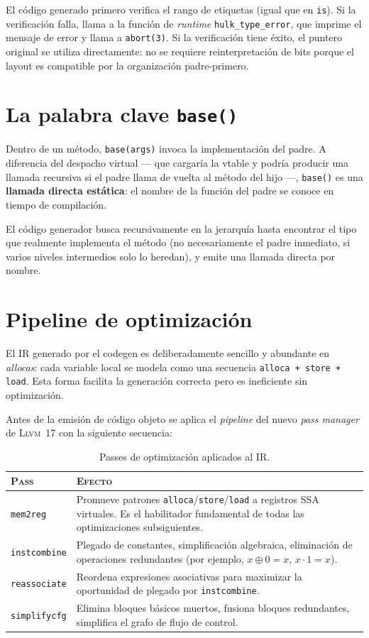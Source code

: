 \documentclass[11pt,a4paper,oneside,openany]{report}
\newcommand{\code}[1]{\texttt{#1}}
\newcommand{\llvm}{\textsc{Llvm}}
\begin{document}
El código generado primero verifica el rango de etiquetas (igual que en \code{is}).
Si la verificación falla, llama a la función de \textit{runtime}
\code{hulk\_type\_error}, que imprime el mensaje de error y llama a \code{abort(3)}.
Si la verificación tiene éxito, el puntero original se utiliza directamente: no se
requiere reinterpretación de bits porque el layout es compatible por la
organización padre-primero.

\section{La palabra clave \code{base()}}

Dentro de un método, \code{base(args)} invoca la implementación del padre. A
diferencia del despacho virtual --- que cargaría la vtable y podría producir una
llamada recursiva si el padre llama de vuelta al método del hijo ---, \code{base()}
es una \textbf{llamada directa estática}: el nombre de la función del padre se
conoce en tiempo de compilación.

El código generador busca recursivamente en la jerarquía hasta encontrar el tipo
que realmente implementa el método (no necesariamente el padre inmediato, si
varios niveles intermedios solo lo heredan), y emite una llamada directa por
nombre.

\section{Pipeline de optimización}

El IR generado por el codegen es deliberadamente sencillo y abundante en
\textit{allocas}: cada variable local se modela como una secuencia
\code{alloca + store + load}. Esta forma facilita la generación correcta pero es
ineficiente sin optimización.

Antes de la emisión de código objeto se aplica el \textit{pipeline} del nuevo
\textit{pass manager} de \llvm{}~17 con la siguiente secuencia:

\begin{table}[H]
\centering
\caption{Passes de optimización aplicados al IR.}
\label{tab:passes}
\begin{tabularx}{\textwidth}{lX}
\toprule
\textsc{Pass} & \textsc{Efecto} \\
\midrule
\code{mem2reg} & Promueve patrones \code{alloca}/\code{store}/\code{load} a
  registros SSA virtuales. Es el habilitador fundamental de todas las
  optimizaciones subsiguientes. \\
\code{instcombine} & Plegado de constantes, simplificación algebraica, eliminación
  de operaciones redundantes (por ejemplo, $x \oplus 0 = x$, $x \cdot 1 = x$). \\
\code{reassociate} & Reordena expresiones asociativas para maximizar la oportunidad
  de plegado por \code{instcombine}. \\
\code{simplifycfg} & Elimina bloques básicos muertos, fusiona bloques redundantes,
  simplifica el grafo de flujo de control. \\
\bottomrule
\end{tabularx}
\end{table}
\end{document}

